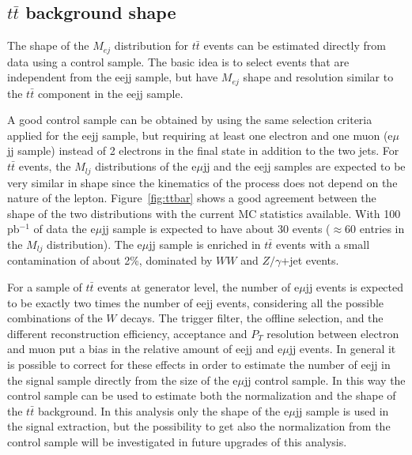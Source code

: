 \subsection{$t\bar{t}$ background shape}

The shape of the $M_{ej}$ distribution for $t\bar{t}$ events can be estimated directly from data using a control sample. 
The basic idea is to select events that are independent from the eejj sample, but have $M_{ej}$ shape and resolution 
similar to the $t\bar{t}$ component in the eejj sample.

A good control sample can be obtained by using the same selection criteria applied for the eejj sample, but 
requiring at least one electron and one muon (e$\mu$jj sample) instead of 2 electrons 
in the final state in addition to the two jets. 
For $t\bar{t}$ events, the $M_{lj}$ distributions of the e$\mu$jj and the eejj samples
are expected to be very similar in shape since the kinematics of the process does not depend 
on the nature of the lepton. Figure~\ref{fig:ttbar} shows a good agreement between 
the shape of the two distributions with the current MC statistics available. 
With 100 pb$^{-1}$ of data the e$\mu$jj sample is expected to have about 30 events 
($\approx 60$ entries in the $M_{lj}$ distribution).
The e$\mu$jj sample is enriched in $t\bar{t}$ events with a small contamination of about 
2\%, dominated by $WW$ and $Z/\gamma$+jet events. 

For a sample of $t\bar{t}$ events at generator level, the number of e$\mu$jj events is expected to be exactly two times the number of 
eejj events, considering all the possible combinations of the $W$ decays. The trigger filter, the offline selection, 
and the different reconstruction efficiency, acceptance and $P_{T}$ resolution between electron and muon
put a bias in the relative amount of eejj and e$\mu$jj events.
In general it is possible to correct for these effects in order to estimate the number of eejj in the signal sample directly from 
the size of the e$\mu$jj control sample. In this way the control sample can be used to estimate both the normalization and the shape
of the $t\bar{t}$ background. In this analysis only the shape of the e$\mu$jj sample is used in the signal extraction, but
the possibility to get also the normalization from the control sample will be investigated in future upgrades of this analysis.


